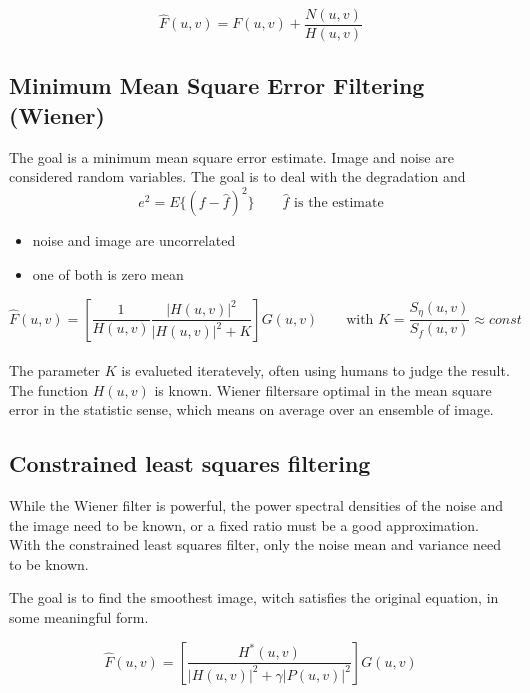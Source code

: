 \begin{equation}
	\hat{F}(u,v)= F(u,v) + \frac{N(u,v)}{H(u,v)}
\end{equation}


\subsection{Minimum Mean Square Error Filtering (Wiener) }
The goal is a minimum mean square error estimate. Image and noise are considered random variables. The goal is to deal with the degradation and
\begin{equation}
	e^2 = E\{(f- \hat{f})^2 \} \qquad \hat{f} \text{ is the estimate}
\end{equation}

\begin{itemize}
	\item noise and image are uncorrelated
	\item one of both is zero mean
\end{itemize}

\begin{equation}
	\hat{F}(u,v) = \left[ \frac{1}{H(u,v)} \frac{|H(u,v)|^2}{|H(u,v)|^2 +K} \right] G(u,v) \qquad \textrm{with } K = \frac{S_{\eta}(u,v)}{S_f(u,v)} \approx const
\end{equation}\\

The parameter $K$ is evalueted iteratevely, often using humans to judge the result. The function $H(u,v)$ is known.
 Wiener filtersare optimal in the mean square error in the statistic sense, which means on average over an ensemble of image.

\subsection{Constrained least squares filtering }
While the Wiener filter is powerful, the power spectral densities of the noise and the image need to be known, or a fixed ratio must be a good approximation. With the constrained least squares filter, only the noise mean and variance need to be known.

The goal is to find the smoothest image, witch satisfies the original equation, in some meaningful form.

\begin{equation}
	\hat{F}(u,v) = \left[ \frac{H^*(u,v)}{|H(u,v)|^2 + \gamma |P(u,v)|^2} \right] G(u,v)
	\label{eq:ConstrainedFilter}
\end{equation}\\

